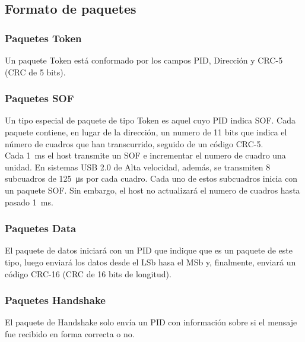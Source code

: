 \subsection{Formato de paquetes}
	
	\subsubsection*{Paquetes Token}
		Un paquete Token está conformado por los campos PID, Dirección y CRC-5 (CRC de 5 bits).\\
		
	\subsubsection*{Paquetes SOF}
		Un tipo especial de paquete de tipo Token es aquel cuyo PID indica SOF. Cada paquete contiene, en lugar de la dirección, un numero de 11 bits que indica el número de cuadros que han transcurrido, seguido de un código CRC-5.\\
		
		Cada \SI{1}{\milli\second} el host transmite un SOF e incrementar el numero de cuadro una unidad. En sistemas USB 2.0 de Alta velocidad, además, se transmiten 8 subcuadros de \SI{125}{\micro\second} por cada cuadro. Cada uno de estos subcuadros inicia con un paquete SOF. Sin embargo, el host no actualizará el numero de cuadros hasta pasado \SI{1}{\milli\second}.\\
		
	\subsubsection*{Paquetes Data}
		El paquete de datos iniciará con un PID que indique que es un paquete de este tipo, luego enviará los datos desde el LSb hasa el MSb y, finalmente, enviará un código CRC-16 (CRC de 16 bits de longitud).\\
		
	\subsubsection*{Paquetes Handshake}
		El paquete de Handshake solo envía un PID con información sobre si el mensaje fue recibido en forma correcta o no.\\